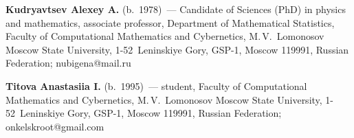 \vspace*{3pt}

\noindent
\textbf{Kudryavtsev Alexey A.} (b.\ 1978)~--- 
Candidate of Sciences (PhD) in physics and mathematics, associate professor,
 Department of Mathematical Statistics, Faculty of Computational Mathematics 
 and Cybernetics, M.\,V.~Lomonosov Moscow State University, 1-52~Leninskiye Gory, 
 GSP-1, Moscow 119991, Russian Federation; \mbox{nubigena@mail.ru}
 
 \vspace*{3pt}

\noindent
\textbf{Titova Anastasiia I.} (b.\ 1995)~--- 
student, Faculty of Computational Mathematics and Cybernetics, 
M.\,V.~Lomonosov Moscow State University, 1-52~Leninskiye Gory, GSP-1, Moscow 119991, 
Russian Federation; \mbox{onkelskroot@gmail.com}

\label{end\stat}

\renewcommand{\bibname}{\protect\rm Литература}       
